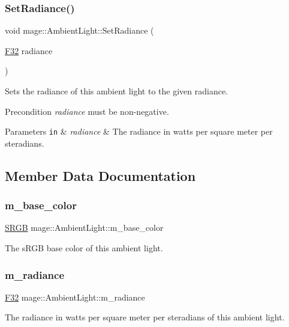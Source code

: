 \subsubsection{\texorpdfstring{Set\+Radiance()}{SetRadiance()}}
{\footnotesize\ttfamily void mage\+::\+Ambient\+Light\+::\+Set\+Radiance (\begin{DoxyParamCaption}\item[{\hyperlink{namespacemage_aa97e833b45f06d60a0a9c4fc22ae02c0}{F32}}]{radiance }\end{DoxyParamCaption})\hspace{0.3cm}{\ttfamily [noexcept]}}

Sets the radiance of this ambient light to the given radiance.

\begin{DoxyPrecond}{Precondition}
{\itshape radiance} must be non-\/negative. 
\end{DoxyPrecond}

\begin{DoxyParams}[1]{Parameters}
\mbox{\tt in}  & {\em radiance} & The radiance in watts per square meter per steradians. \\
\hline
\end{DoxyParams}


\subsection{Member Data Documentation}
\hypertarget{classmage_1_1_ambient_light_ae23403481bf3d82082c4955b7b5a2c52}{}\label{classmage_1_1_ambient_light_ae23403481bf3d82082c4955b7b5a2c52} 
\subsubsection{\texorpdfstring{m\+\_\+base\+\_\+color}{m\_base\_color}}
{\footnotesize\ttfamily \hyperlink{structmage_1_1_s_r_g_b}{S\+R\+GB} mage\+::\+Ambient\+Light\+::m\+\_\+base\+\_\+color\hspace{0.3cm}{\ttfamily [private]}}

The s\+R\+GB base color of this ambient light. \hypertarget{classmage_1_1_ambient_light_a579aff19284637d89d85026b373574aa}{}\label{classmage_1_1_ambient_light_a579aff19284637d89d85026b373574aa} 
\subsubsection{\texorpdfstring{m\+\_\+radiance}{m\_radiance}}
{\footnotesize\ttfamily \hyperlink{namespacemage_aa97e833b45f06d60a0a9c4fc22ae02c0}{F32} mage\+::\+Ambient\+Light\+::m\+\_\+radiance\hspace{0.3cm}{\ttfamily [private]}}

The radiance in watts per square meter per steradians of this ambient light. 